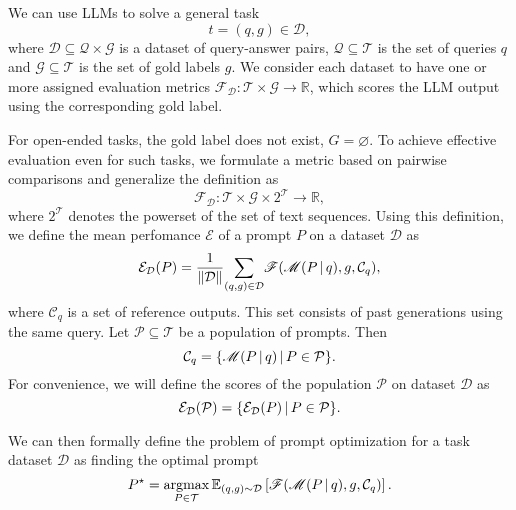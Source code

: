 We can use LLMs to solve a general task
\begin{equation}
    t = (q, g) \in \mathcal{D},
\end{equation}
where $\mathcal{D} \subseteq \mathcal{Q} \times \mathcal{G}$ is a dataset of query-answer pairs, $\mathcal{Q}\subseteq\mathcal{T}$ is the set of queries $q$
and $\mathcal{G}\subseteq\mathcal{T}$ is the set of gold labels $g$.
We consider each dataset to have one or more assigned evaluation metrics $\mathscr{F}_{\mathcal{D}}: \mathcal{T} \times \mathcal{G} \rightarrow \mathbb{R}$,
which scores the LLM output using the corresponding gold label. 

For open-ended tasks, the gold label does not exist, $G = \varnothing$. To achieve effective evaluation even for such tasks, 
we formulate a metric based on pairwise comparisons and generalize the definition as
\begin{equation}
    \mathscr{F}_{\mathcal{D}}: \mathcal{T} \times \mathcal{G} \times 2^\mathcal{T} \rightarrow \mathbb{R},
\end{equation}
where $2^\mathcal{T}$ denotes the powerset of the set of text sequences. Using this definition, we define the mean perfomance $\mathcal{E}$ of a prompt $P$ on a dataset $\mathcal{D}$ as
\begin{equation}
    \mathcal{E}_{\mathcal{D}}(P) = \frac{1}{\Vert \mathcal{D} \Vert}\underset{(q,g)\in \mathcal{D}}{\sum}\mathscr{F}(\mathscr{M}(P\, \vert \, q), g, \mathcal{C}_q),
\end{equation}
where $\mathcal{C}_q$ is a set of reference outputs. This set consists of past generations using the same query.
Let $\mathcal{P} \subseteq \mathcal{T}$ be a population of prompts. Then 
\begin{equation}
    \mathcal{C}_q = \{\mathscr{M}(P\, \vert \, q)\, \vert \, P \in \mathcal{P}\}.
\end{equation}
For convenience, we will define the scores of the population $\mathcal{P}$ on dataset $\mathcal{D}$ as
\begin{equation}
    \mathcal{E}_{\mathcal{D}}(\mathcal{P}) = \{\mathcal{E}_{\mathcal{D}}(P)\, \vert \, P\in \mathcal{P}\}.
\end{equation}

We can then formally define the problem of prompt optimization for a task dataset $\mathcal{D}$ as finding the optimal prompt 
\begin{equation}
    \label{eq:optimdef}
    P^{\star} = \underset{P\in\mathcal{T}}{\operatorname{argmax}}\,\mathbb{E}_{(q, g) \sim \mathcal{D}}\left[\mathscr{F}(\mathscr{M}(P \, \vert \, q), g, \mathcal{C}_q)\right].
\end{equation}

